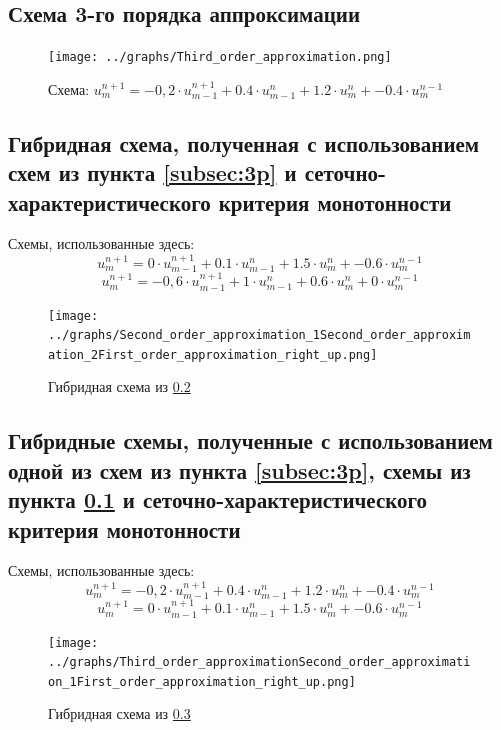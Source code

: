 \documentclass[a4paper, 12pt]{article} %
\begin{document}
\newpage
\subsection{Схема 3-го порядка аппроксимации}
\label{subsec:4p}
\begin{figure}[h!]
    \centering
    \texttt{[image: ../graphs/Third\_order\_approximation.png]}
    \caption{Схема: $u^{n+1}_{m} = -0,2 \cdot u^{n+1}_{m-1} + 0.4 \cdot u^{n}_{m-1} + 1.2 \cdot u^{n}_{m} + -0.4 \cdot u^{n-1}_{m}$ \\ }
    \label{fig:vac}
\end{figure}

\newpage
\subsection{Гибридная схема, полученная с использованием схем из пункта \ref{subsec:3p} и сеточно-характеристического критерия монотонности}
\label{subsec:5p}
Схемы, использованные здесь:
$$u^{n+1}_{m} = 0 \cdot u^{n+1}_{m-1} + 0.1 \cdot u^{n}_{m-1} + 1.5 \cdot u^{n}_{m} + -0.6 \cdot u^{n-1}_{m}$$
$$u^{n+1}_{m} = -0,6 \cdot u^{n+1}_{m-1} + 1 \cdot u^{n}_{m-1} + 0.6 \cdot u^{n}_{m} + 0 \cdot u^{n-1}_{m}$$
\begin{figure}[h!]
    \centering
    \texttt{[image: ../graphs/Second\_order\_approximation\_1Second\_order\_approximation\_2First\_order\_approximation\_right\_up.png]}
    \caption{Гибридная схема из \ref{subsec:5p} \\ }
    \label{fig:vac}
\end{figure}

\newpage
\subsection{Гибридные схемы, полученные с использованием одной из схем из пункта \ref{subsec:3p}, схемы из пункта \ref{subsec:4p} и сеточно-характеристического критерия монотонности}
\label{subsec:6p}
Схемы, использованные здесь:
$$u^{n+1}_{m} = -0,2 \cdot u^{n+1}_{m-1} + 0.4 \cdot u^{n}_{m-1} + 1.2 \cdot u^{n}_{m} + -0.4 \cdot u^{n-1}_{m}$$
$$u^{n+1}_{m} = 0 \cdot u^{n+1}_{m-1} + 0.1 \cdot u^{n}_{m-1} + 1.5 \cdot u^{n}_{m} + -0.6 \cdot u^{n-1}_{m}$$

\begin{figure}[h!]
    \centering
    \texttt{[image: ../graphs/Third\_order\_approximationSecond\_order\_approximation\_1First\_order\_approximation\_right\_up.png]}
    \caption{Гибридная схема из \ref{subsec:6p} \\ }
    \label{fig:vac}
\end{figure}
\end{document}
